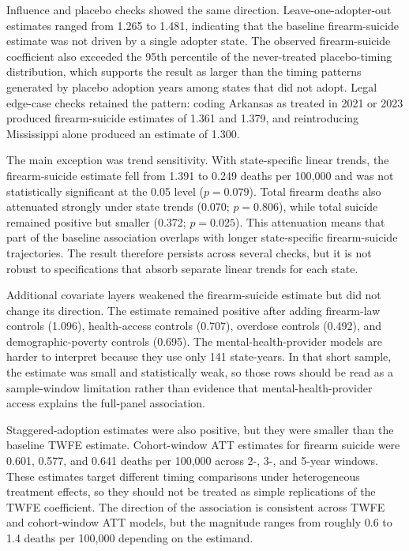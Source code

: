 \documentclass[11pt]{article}
\begin{document}


Influence and placebo checks showed the same direction. Leave-one-adopter-out estimates ranged from 1.265 to 1.481, indicating that the baseline firearm-suicide estimate was not driven by a single adopter state. The observed firearm-suicide coefficient also exceeded the 95th percentile of the never-treated placebo-timing distribution, which supports the result as larger than the timing patterns generated by placebo adoption years among states that did not adopt. Legal edge-case checks retained the pattern: coding Arkansas as treated in 2021 or 2023 produced firearm-suicide estimates of 1.361 and 1.379, and reintroducing Mississippi alone produced an estimate of 1.300.

The main exception was trend sensitivity. With state-specific linear trends, the firearm-suicide estimate fell from 1.391 to 0.249 deaths per 100,000 and was not statistically significant at the 0.05 level ($p=0.079$). Total firearm deaths also attenuated strongly under state trends (0.070; $p=0.806$), while total suicide remained positive but smaller (0.372; $p=0.025$). This attenuation means that part of the baseline association overlaps with longer state-specific firearm-suicide trajectories. The result therefore persists across several checks, but it is not robust to specifications that absorb separate linear trends for each state.

Additional covariate layers weakened the firearm-suicide estimate but did not change its direction. The estimate remained positive after adding firearm-law controls (1.096), health-access controls (0.707), overdose controls (0.492), and demographic-poverty controls (0.695). The mental-health-provider models are harder to interpret because they use only 141 state-years. In that short sample, the estimate was small and statistically weak, so those rows should be read as a sample-window limitation rather than evidence that mental-health-provider access explains the full-panel association.

Staggered-adoption estimates were also positive, but they were smaller than the baseline TWFE estimate. Cohort-window ATT estimates for firearm suicide were 0.601, 0.577, and 0.641 deaths per 100,000 across 2-, 3-, and 5-year windows. These estimates target different timing comparisons under heterogeneous treatment effects, so they should not be treated as simple replications of the TWFE coefficient. The direction of the association is consistent across TWFE and cohort-window ATT models, but the magnitude ranges from roughly 0.6 to 1.4 deaths per 100,000 depending on the estimand.
\end{document}
